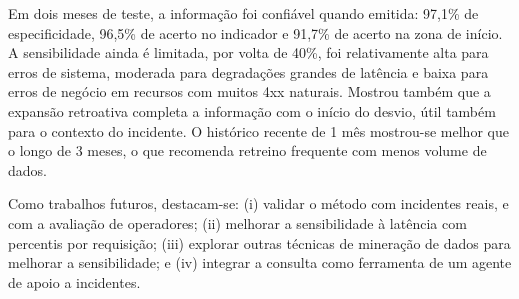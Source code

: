 \documentclass[sigconf,nonacm]{acmart}
\begin{document}
Em dois meses de teste, a informação foi confiável quando emitida: 97,1\% de especificidade, 96,5\% de acerto no indicador e 91,7\% de acerto na zona de início. A sensibilidade ainda é limitada, por volta de 40\%, foi relativamente alta para erros de sistema, moderada para degradações grandes de latência e baixa para erros de negócio em recursos com muitos 4xx naturais. Mostrou também que a expansão retroativa completa a informação com o início do desvio, útil também para o contexto do incidente. O histórico recente de 1 mês mostrou-se melhor que o longo de 3 meses, o que recomenda retreino frequente com menos volume de dados.

Como trabalhos futuros, destacam-se: (i) validar o método com incidentes reais, e com a avaliação de operadores; (ii) melhorar a sensibilidade à latência com percentis por requisição; (iii) explorar outras técnicas de mineração de dados para melhorar a sensibilidade; e (iv) integrar a consulta como ferramenta de um agente de apoio a incidentes.



\end{document}
